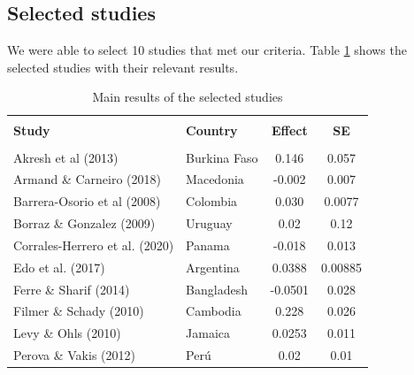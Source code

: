\documentclass[a4paper, 10pt]{article}
\begin{document}



\subsection{Selected studies}

We were able to select 10 studies that met our criteria. Table \ref{tab:studies} shows the selected studies with their relevant results.

\begin{table}[!htbp]
\caption{Main results of the selected studies}
\label{tab:studies}
\begin{center}
\begin{tabular}{llcc}
\hline\hline
                                  &                     &                    & \\
\textbf{Study}                    & \textbf{Country}    & \textbf{Effect}    & \textbf{SE}\\[10pt]
\hline
                                  &                     &                    & \\
Akresh et al (2013)               & Burkina Faso        & 0.146              & 0.057\\[5pt]
Armand \& Carneiro (2018)         & Macedonia           & -0.002             & 0.007\\[5pt]
Barrera-Osorio et al (2008)       & Colombia            & 0.030              & 0.0077\\[5pt]
Borraz \& Gonzalez (2009)         & Uruguay             & 0.02               & 0.12\\[5pt]
Corrales-Herrero et al. (2020)    & Panama              & -0.018             & 0.013\\[5pt]
Edo et al. (2017)                 & Argentina           & 0.0388             & 0.00885\\[5pt]
Ferre \& Sharif (2014)            & Bangladesh          & -0.0501            & 0.028\\[5pt]
Filmer \& Schady (2010)           & Cambodia            & 0.228              & 0.026\\[5pt]
Levy \& Ohls (2010)               & Jamaica             & 0.0253             & 0.011\\[5pt]
Perova \& Vakis (2012)            & Perú                & 0.02               & 0.01\\[5pt]
\hline\hline
\end{tabular}
\end{center}
\end{table}
\end{document}
